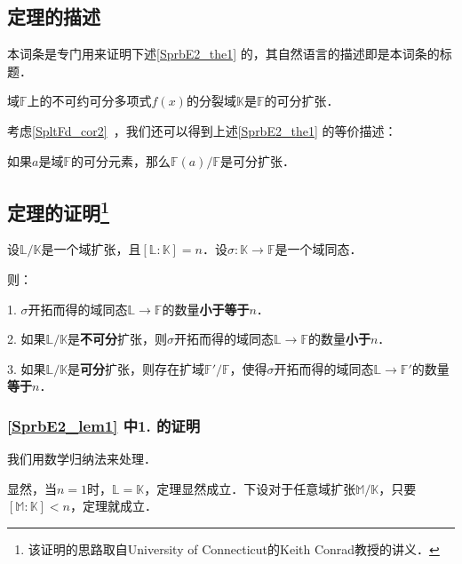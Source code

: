 

\subsection{定理的描述}

本词条是专门用来证明下述\autoref{SprbE2_the1} 的，其自然语言的描述即是本词条的标题．

\begin{theorem}{}\label{SprbE2_the1}
域$\mathbb{F}$上的不可约可分多项式$f(x)$的分裂域$\mathbb{K}$是$\mathbb{F}$的可分扩张．
\end{theorem}

考虑\autoref{SpltFd_cor2}~，我们还可以得到上述\autoref{SprbE2_the1} 的等价描述：

\begin{theorem}{}
如果$a$是域$\mathbb{F}$的可分元素，那么$\mathbb{F}(a)/\mathbb{F}$是可分扩张．
\end{theorem}



\subsection{定理的证明\footnote{该证明的思路取自University of Connecticut的Keith Conrad教授的讲义．}}

\begin{lemma}{}\label{SprbE2_lem1}
设$\mathbb{L}/\mathbb{K}$是一个域扩张，且$[\mathbb{L}:\mathbb{K}]=n$．设$\sigma:\mathbb{K}\to\mathbb{F}$是一个域同态．

则：

1. $\sigma$开拓而得的域同态$\mathbb{L}\to\mathbb{F}$的数量\textbf{小于等于}$n$．

2. 如果$\mathbb{L}/\mathbb{K}$是\textbf{不可分}扩张，则$\sigma$开拓而得的域同态$\mathbb{L}\to\mathbb{F}$的数量\textbf{小于}$n$．

3. 如果$\mathbb{L}/\mathbb{K}$是\textbf{可分}扩张，则存在扩域$\mathbb{F}'/\mathbb{F}$，使得$\sigma$开拓而得的域同态$\mathbb{L}\to\mathbb{F}'$的数量\textbf{等于}$n$．

\end{lemma}




\subsubsection{\autoref{SprbE2_lem1} 中1. 的证明}

我们用数学归纳法来处理．

显然，当$n=1$时，$\mathbb{L}=\mathbb{K}$，定理显然成立．下设对于任意域扩张$\mathbb{M}/\mathbb{K}$，只要$[\mathbb{M}:\mathbb{K}]<n$，定理就成立．
















